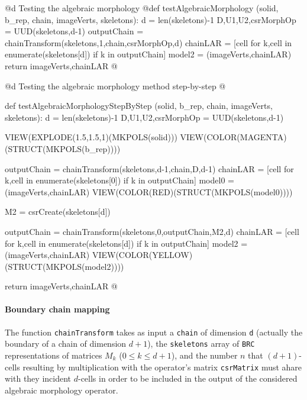 \documentclass[11pt,oneside]{article}	%
\begin{document}

@d Testing the algebraic morphology
@{def testAlgebraicMorphology (solid, b_rep, chain, imageVerts, skeletons):
	d = len(skeletons)-1
	D,U1,U2,csrMorphOp = UUD(skeletons,d-1)
	outputChain = chainTransform(skeletons,1,chain,csrMorphOp,d)
	chainLAR = [cell for k,cell in enumerate(skeletons[d]) if k in outputChain]
	model2 = (imageVerts,chainLAR)
	return imageVerts,chainLAR
@}

@d Testing the algebraic morphology method step-by-step
@{def testAlgebraicMorphologyStepByStep (solid, b_rep, chain, imageVerts, skeletons):
	d = len(skeletons)-1
	D,U1,U2,csrMorphOp = UUD(skeletons,d-1)
	
	VIEW(EXPLODE(1.5,1.5,1)(MKPOLS(solid)))
	VIEW(COLOR(MAGENTA)(STRUCT(MKPOLS(b_rep))))
	
	outputChain = chainTransform(skeletons,d-1,chain,D,d-1)
	chainLAR = [cell for k,cell in enumerate(skeletons[0]) if k in outputChain]
	model0 = (imageVerts,chainLAR)
	VIEW(COLOR(RED)(STRUCT(MKPOLS(model0))))
	
	M2 = csrCreate(skeletons[d])
	
	outputChain = chainTransform(skeletons,0,outputChain,M2,d)
	chainLAR = [cell for k,cell in enumerate(skeletons[d]) if k in outputChain]
	model2 = (imageVerts,chainLAR)
	VIEW(COLOR(YELLOW)(STRUCT(MKPOLS(model2))))
	
	return imageVerts,chainLAR
@}

\paragraph{Boundary chain mapping}
The function \texttt{chainTransform} takes as input a \texttt{chain} of dimension \texttt{d} (actually the boundary of a chain of dimension $d+1$), the \texttt{skeletons} array of \texttt{BRC} representations of matrices $M_k$ ($0\leq k\leq d+1$), and the number $n$ that $(d+1)$-cells resulting by multiplication with the operator's matrix \texttt{csrMatrix} must ahare with they incident $d$-cells in order to be included in the output of the considered algebraic morphology operator.
\end{document}
